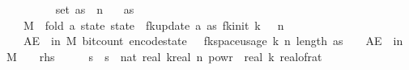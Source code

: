 \begin{isabellebody}
\ \ \ {\isachardoublequoteopen}{\isasymdelta}\ {\isachargreater}{\kern0pt}\ {}{\isachardoublequoteclose}\isanewline
\ \ \ {\isachardoublequoteopen}set\ as\ {\isasymsubseteq}\ {\isacharbraceleft}{\kern0pt}{}{\isachardot}{\kern0pt}{\isachardot}{\kern0pt}{\isacharless}{\kern0pt}n{\isacharbraceright}{\kern0pt}{\isachardoublequoteclose}\isanewline
\ \ \ {\isachardoublequoteopen}as\ {\isasymnoteq}\ {\isacharbrackleft}{\kern0pt}{\isacharbrackright}{\kern0pt}{\isachardoublequoteclose}\isanewline
\ \ \ {\isachardoublequoteopen}M\ {\isasymequiv}\ fold\ {\isacharparenleft}{\kern0pt}{\isasymlambda}a\ state{\isachardot}{\kern0pt}\ state\ {\isasymbind}\ fk{\isacharunderscore}{\kern0pt}update\ a{\isacharparenright}{\kern0pt}\ as\ {\isacharparenleft}{\kern0pt}fk{\isacharunderscore}{\kern0pt}init\ k\ {\isasymdelta}\ {\isasymepsilon}\ n{\isacharparenright}{\kern0pt}{\isachardoublequoteclose}\isanewline
\ \ \ {\isachardoublequoteopen}AE\ {\isasymomega}\ in\ M{\isachardot}{\kern0pt}\ bit{\isacharunderscore}{\kern0pt}count\ {\isacharparenleft}{\kern0pt}encode{\isacharunderscore}{\kern0pt}state\ {\isasymomega}{\isacharparenright}{\kern0pt}\ {\isasymle}\ fk{\isacharunderscore}{\kern0pt}space{\isacharunderscore}{\kern0pt}usage\ {\isacharparenleft}{\kern0pt}k{\isacharcomma}{\kern0pt}\ n{\isacharcomma}{\kern0pt}\ length\ as{\isacharcomma}{\kern0pt}\ {\isasymepsilon}{\isacharcomma}{\kern0pt}\ {\isasymdelta}{\isacharparenright}{\kern0pt}{\isachardoublequoteclose}\ {\isacharparenleft}{\kern0pt}\ {\isachardoublequoteopen}AE\ {\isasymomega}\ in\ M{\isachardot}{\kern0pt}\ {\isacharparenleft}{\kern0pt}{\isacharunderscore}{\kern0pt}\ \ {\isasymle}\ {\isacharquery}{\kern0pt}rhs{\isacharparenright}{\kern0pt}{\isachardoublequoteclose}{\isacharparenright}{\kern0pt}\isanewline
%
\isadelimproof
%
\endisadelimproof
%
\isatagproof
{}\isamarkupfalse%
\ {\isacharminus}{\kern0pt}\isanewline
\ \ \isamarkupfalse%
\ s\ \ {\isachardoublequoteopen}s\ {\isacharequal}{\kern0pt}\ nat\ {\isasymlceil}{}{\isacharasterisk}{\kern0pt}real\ k{\isacharasterisk}{\kern0pt}{\isacharparenleft}{\kern0pt}real\ n{\isacharparenright}{\kern0pt}\ powr\ {\isacharparenleft}{\kern0pt}{}{\isacharminus}{\kern0pt}{}{\isacharslash}{\kern0pt}\ real\ k{\isacharparenright}{\kern0pt}{\isacharslash}{\kern0pt}\ {\isacharparenleft}{\kern0pt}real{\isacharunderscore}{\kern0pt}of{\isacharunderscore}{\kern0pt}rat\ {\isasymdelta}{\isacharparenright}{\kern0pt}\isanewline

\end{isabellebody}
